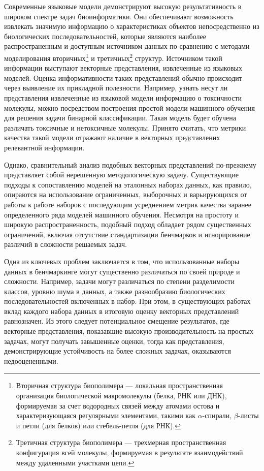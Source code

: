 \documentclass[specification,annotation,times]{itmo-student-thesis}
\begin{document}
\tableofcontents

\startprefacepage

Современные языковые модели демонстрируют высокую результативность в широком спектре задач биоинформатики. 
Они обеспечивают возможность извлекать значимую информацию о характеристиках объектов непосредственно из биологических последовательностей, 
которые являются наиболее распространенным и доступным источником данных по сравнению с методами моделирования вторичных\footnote{Вторичная структура биополимера — локальная пространственная организация биологической макромолекулы (белка, РНК или ДНК), формируемая за счет водородных связей между атомами остова и характеризующаяся регулярными элементами, такими как $α$-спирали, $β$-листы и петли (для белков) или стебель-петля (для РНК).} и третичных\footnote{Третичная структура биополимера — трехмерная пространственная конфигурация всей молекулы, формируемая в результате взаимодействий между удаленными участками цепи.} структур. Источником такой информации выступают векторные представления, извлеченные из языковых моделей. Оценка информативности таких представлений обычно происходит через выявление их прикладной полезности. Например, узнать несут ли представления извлеченные из языковой модели информацию о токсичности молекулы, можно посредством построения простой модели машинного обучения для решения задачи бинарной классификации. Такая модель будет обучена различать токсичные и нетоксичные молекулы. Принято считать, что метрики качества такой модели отражают наличие в векторных представлених релевантной информации.

Однако, сравнительный анализ подобных векторных представлений по-прежнему представляет собой нерешенную методологическую задачу. Существующие подходы к сопоставлению моделей на эталонных наборах данных, как правило, опираются на использование ограниченных, выборочных и варьирующихся от работы к работе наборов с последующим усреднением метрик качества заранее определенного ряда моделей машинного обучения. Несмотря на простоту и широкую распространенность, подобный подход обладает рядом существенных ограничений, включая отсутствие стандартизации бенчмарков и игнорирование различий в сложности решаемых задач.

Одна из ключевых проблем заключается в том, что использованные наборы данных в бенчмаркинге могут существенно различаться по своей природе и сложности. Например, задачи могут различаться по  степени разделимости классов, уровню шума в данных, а также разнообразию биологических последовательностей включенных в набор. При этом, в существующих работах вклад каждого набора данных в итоговую оценку векторных представлений равнозначен. Из этого следует потенциальное смещение результатов, где векторные представления, показавшие высокую производительность на простых задачах, могут получать завышенные оценки, тогда как представления, демонстрирующие устойчивость на более сложных задачах, оказываются недооцененными.
\end{document}
